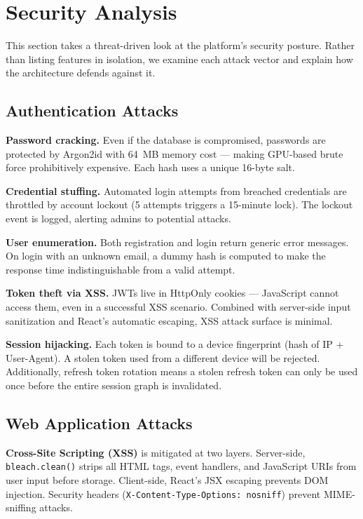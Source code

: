 
\section{Security Analysis}
\label{sec:security}

This section takes a threat-driven look at the platform's security posture. Rather than listing features in isolation, we examine each attack vector and explain how the architecture defends against it.

\subsection{Authentication Attacks}

\textbf{Password cracking.} Even if the database is compromised, passwords are protected by Argon2id with 64~MB memory cost — making GPU-based brute force prohibitively expensive. Each hash uses a unique 16-byte salt.

\textbf{Credential stuffing.} Automated login attempts from breached credentials are throttled by account lockout (5 attempts triggers a 15-minute lock). The lockout event is logged, alerting admins to potential attacks.

\textbf{User enumeration.} Both registration and login return generic error messages. On login with an unknown email, a dummy hash is computed to make the response time indistinguishable from a valid attempt.

\textbf{Token theft via XSS.} JWTs live in HttpOnly cookies — JavaScript cannot access them, even in a successful XSS scenario. Combined with server-side input sanitization and React's automatic escaping, XSS attack surface is minimal.

\textbf{Session hijacking.} Each token is bound to a device fingerprint (hash of IP + User-Agent). A stolen token used from a different device will be rejected. Additionally, refresh token rotation means a stolen refresh token can only be used once before the entire session graph is invalidated.

\subsection{Web Application Attacks}

\textbf{Cross-Site Scripting (XSS)} is mitigated at two layers. Server-side, \texttt{bleach.clean()} strips all HTML tags, event handlers, and JavaScript URIs from user input before storage. Client-side, React's JSX escaping prevents DOM injection. Security headers (\texttt{X-Content-Type-Options: nosniff}) prevent MIME-sniffing attacks.

